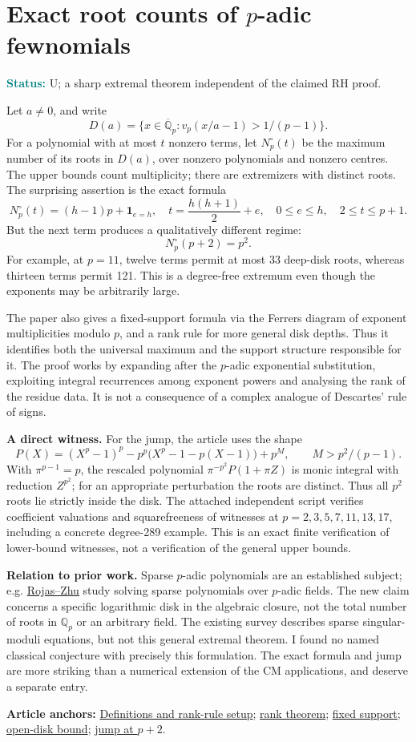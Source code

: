 \documentclass[11pt]{article}
\newcommand{\art}[3]{\href{https://github.com/VladimirReshetnikov/ProveIt/blob/3c4d27a69c98d09319a51e41a19fca05bb80a3e2/Analysis/GeneralizedRiemannHypothesis/Article/sections/#1.tex\#L#2}{#3}}
\newcommand{\status}[1]{\par\smallskip\noindent\textcolor{teal}{\textbf{Status:}} #1\par\smallskip}
\newcommand{\sources}[1]{\par\smallskip\noindent\textbf{Article anchors:} #1\par}
\newcommand{\Q}{\mathbb Q}
\begin{document}
\section{Exact root counts of $p$-adic fewnomials}
\status{U; a sharp extremal theorem independent of the claimed RH proof.}
Let $a\ne0$, and write
\[
D(a)=\{x\in\overline{\Q}_p:v_p(x/a-1)>1/(p-1)\}.
\]
For a polynomial with at most $t$ nonzero terms, let $N_p^\circ(t)$ be the maximum number of its roots in $D(a)$, over nonzero polynomials and nonzero centres. The upper bounds count multiplicity; there are extremizers with distinct roots. The surprising assertion is the exact formula
\[
\boxed{N_p^\circ(t)=(h-1)p+\mathbf1_{e=h},\quad
 t=\frac{h(h+1)}2+e,\quad 0\le e\le h,\quad 2\le t\le p+1.}
\]
But the next term produces a qualitatively different regime:
\[
\boxed{N_p^\circ(p+2)=p^2.}
\]
For example, at $p=11$, twelve terms permit at most 33 deep-disk roots, whereas thirteen terms permit 121. This is a degree-free extremum even though the exponents may be arbitrarily large.

The paper also gives a fixed-support formula via the Ferrers diagram of exponent multiplicities modulo $p$, and a rank rule for more general disk depths. Thus it identifies both the universal maximum and the support structure responsible for it. The proof works by expanding after the $p$-adic exponential substitution, exploiting integral recurrences among exponent powers and analysing the rank of the residue data. It is not a consequence of a complex analogue of Descartes' rule of signs.

\textbf{A direct witness.} For the jump, the article uses the shape
\[
P(X)=(X^p-1)^p-p^p\big(X^p-1-p(X-1)\big)+p^M,
\qquad M>p^2/(p-1).
\]
With $\pi^{p-1}=p$, the rescaled polynomial $\pi^{-p^2}P(1+\pi Z)$ is monic integral with reduction $Z^{p^2}$; for an appropriate perturbation the roots are distinct. Thus all $p^2$ roots lie strictly inside the disk. The attached independent script verifies coefficient valuations and squarefreeness of witnesses at $p=2,3,5,7,11,13,17$, including a concrete degree-289 example. This is an exact finite verification of lower-bound witnesses, not a verification of the general upper bounds.

\textbf{Relation to prior work.} Sparse $p$-adic polynomials are an established subject; e.g. \href{https://arxiv.org/abs/2107.09173}{Rojas--Zhu} study solving sparse polynomials over $p$-adic fields. The new claim concerns a specific logarithmic disk in the algebraic closure, not the total number of roots in $\Q_p$ or an arbitrary field. The existing survey describes sparse singular-moduli equations, but not this general extremal theorem. I found no named classical conjecture with precisely this formulation. The exact formula and jump are more striking than a numerical extension of the CM applications, and deserve a separate entry.
\sources{\art{smd}{216}{Definitions and rank-rule setup}; \art{smd}{303}{rank theorem}; \art{smd}{392}{fixed support}; \art{smd}{457}{open-disk bound}; \art{smd}{518}{jump at $p+2$}.}
\clearpage
\end{document}
